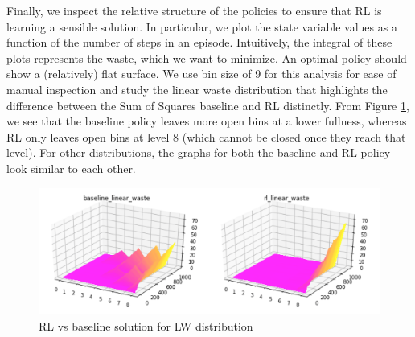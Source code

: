 Finally, we inspect the relative structure of the policies to ensure that RL is learning a sensible solution.  In particular, we plot the state variable values as a function of the number of steps in an episode. Intuitively, the integral of these plots represents the waste, which we want to minimize.  An optimal policy should show a (relatively) flat surface. We use bin size of 9 for this analysis for ease of manual inspection and study the linear waste distribution that highlights the difference between the Sum of Squares baseline and RL distinctly. From Figure \ref{fig:bin_packing_LW_dist}, we see that the baseline policy leaves more open bins at a lower fullness, whereas RL only leaves open bins at level 8 (which cannot be closed once they reach that level). For other distributions, the graphs for both the baseline and RL policy look similar to each other.



\begin{figure}[h!]
	\centering
	\includegraphics[width=1\linewidth]{images/linear_waste_sol.png}
	\caption{RL vs baseline solution for LW distribution}
	\label{fig:bin_packing_LW_dist}
		\vspace{-1em}
\end{figure}

%

